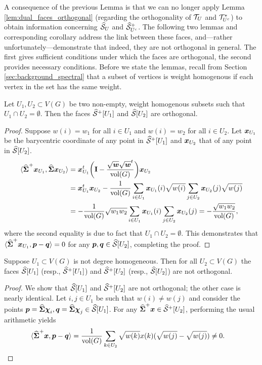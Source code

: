 A consequence of the previous Lemma is that we can no longer apply Lemma \ref{lem:dual_faces_orthogonal} (regarding the orthogonality of $\mathcal{T}_U$ and $\mathcal{T}_{U^c}^*$) to obtain information concerning $\widehat{\mathcal{S}}_U$ and $\widehat{\mathcal{S}}_{U^c}^+$. The following two lemmas and corresponding corollary address the link between these faces, and---rather unfortunately---demonstrate that indeed, they are not orthogonal in general. 
The first gives sufficient conditions under which the faces are orthogonal, the second provides necessary conditions. 
Before we state the lemmas, recall from Section \ref{sec:background_spectral} that a subset of vertices is weight  homogenous if each vertex in the set has the same weight. 

\begin{lemma}
	\label{lem:Sn_perp_homogenous}
	Let $U_1,U_2\subset V(G)$ be two non-empty, weight homogenous subsets such that $U_1\cap U_2=\emptyset$. Then the faces $\widehat{\mathcal{S}}^+[U_1]$ and $\widehat{\mathcal{S}}[U_2]$ are orthogonal. 
\end{lemma}
\begin{proof}
	Suppose $w(i)=w_1$ for all $i\in U_1$ and $w(i)=w_2$ for all $i\in U_2$. Let $\vb*{x}_{U_1}$ be the barycentric coordinate of any point in $\widehat{\mathcal{S}}^+[U_1]$ and $\vb*{x}_{U_2}$ that of any point in $\widehat{\mathcal{S}}[U_2]$. 
	\begin{align*}
	\langle \widehat{\boldsymbol{\Sigma}}^+\vb*{x}_{U_1},\widehat{\boldsymbol{\Sigma}}\vb*{x}_{U_2}\rangle &= \vb*{x}_{U_1}^t \bigg(\vb{I}-\frac{\sqrt{\vb*{w}}\sqrt{\vb*{w}}^t}{\textnormal{vol}(G)}\bigg) \vb*{x}_{U_2}\\
	&= \vb*{x}_{U_1}^t\vb*{x}_{U_2} - \frac{1}{\textnormal{vol}(G)}\sum_{i\in U_1}\vb*{x}_{U_1}(i)\sqrt{w(i)}\sum_{j\in U_2}\vb*{x}_{U_2}(j) \sqrt{w(j)} \\
	&= -\frac{1}{\textnormal{vol}(G)}\sqrt{w_1w_2}\sum_{i\in U_1}\vb*{x}_{U_1}(i) \sum_{j\in U_2}\vb*{x}_{U_2}(j) = -\frac{\sqrt{w_1w_2}}{\textnormal{vol}(G)},
	\end{align*} 
	where the second equality is due to fact that $U_1\cap U_2=\emptyset$. This demonstrates that $\langle \widehat{\boldsymbol{\Sigma}}^+\vb*{x}_{U_1},\vb*{p}-\vb*{q}\rangle=0$ for any $\vb*{p},\vb*{q}\in\widehat{\mathcal{S}}[U_2]$, completing the proof. 
\end{proof}

\begin{lemma}
	\label{lem:Sn_not_homogeneous}
	Suppose  $U_1\subset V(G)$ is not degree homogeneous. Then for all $U_2\subset V(G)$ the faces $\widehat{\mathcal{S}}[U_1]$ (resp., $\widehat{\mathcal{S}}^+[U_1]$) and $\widehat{\mathcal{S}}^+[U_2]$ (resp., $\widehat{\mathcal{S}}[U_2]$) are not orthogonal. 
\end{lemma}
\begin{proof}
	We show that $\widehat{\mathcal{S}}[U_1]$ and $\widehat{\mathcal{S}}^+[U_2]$ are not orthogonal; the other case is nearly identical. Let $i,j\in U_1$ be such that $w(i)\neq w(j)$ and consider the points $\vb*{p}=\widehat{\boldsymbol{\Sigma}}\boldsymbol{\chi}_i,\vb*{q}=\widehat{\boldsymbol{\Sigma}}\boldsymbol{\chi}_j\in\widehat{\mathcal{S}}[U_1]$. For any $\widehat{\boldsymbol{\Sigma}}^+\vb*{x}\in\widehat{\mathcal{S}}^+[U_2]$, performing the usual arithmetic yields
	\begin{align*}
	\langle \widehat{\boldsymbol{\Sigma}}^+\vb*{x},\vb*{p}-\vb*{q}\rangle &= \frac{1}{\textnormal{vol}(G)} \sum_{k\in U_2}\sqrt{w(k)}x(k)(\sqrt{w(j)}-\sqrt{w(j)}) \neq 0.\qedhere
	\end{align*}
\end{proof}

